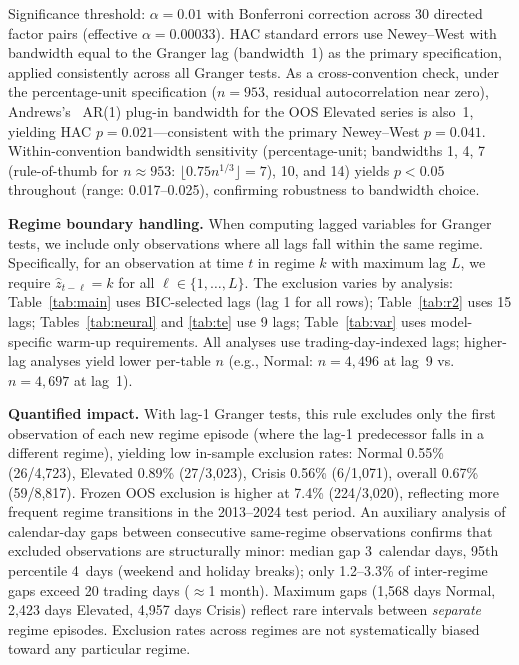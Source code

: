 \documentclass[sigconf,anonymous]{acmart}
\begin{document}
Significance threshold: $\alpha = 0.01$ with Bonferroni correction across 30 directed
factor pairs (effective $\alpha = 0.00033$). HAC standard errors use Newey--West
with bandwidth equal to the Granger lag (bandwidth~1) as the primary specification,
applied consistently across all Granger tests. As a cross-convention check,
under the percentage-unit specification ($n = 953$, residual autocorrelation near zero),
Andrews's~\cite{andrews1991heteroskedasticity} AR(1) plug-in bandwidth for the
OOS Elevated series is also~1, yielding HAC $p = 0.021$---consistent with
the primary Newey--West $p = 0.041$.
Within-convention bandwidth sensitivity (percentage-unit; bandwidths 1, 4, 7
(rule-of-thumb for $n \approx 953$: $\lfloor 0.75 n^{1/3} \rfloor = 7$), 10, and 14)
yields $p < 0.05$ throughout (range: 0.017--0.025), confirming robustness to bandwidth choice.

\textbf{Regime boundary handling.} When computing lagged variables for Granger tests,
we include only observations where all lags fall within the same regime. Specifically,
for an observation at time $t$ in regime $k$ with maximum lag $L$, we require
$\hat{z}_{t-\ell} = k$ for all $\ell \in \{1, \ldots, L\}$. The exclusion varies
by analysis: Table~\ref{tab:main} uses BIC-selected lags (lag 1 for all rows);
Table~\ref{tab:r2} uses 15 lags; Tables~\ref{tab:neural} and \ref{tab:te} use
9 lags; Table~\ref{tab:var} uses model-specific warm-up requirements.
All analyses use trading-day-indexed lags; higher-lag analyses yield lower per-table $n$
(e.g., Normal: $n = 4{,}496$ at lag~9 vs.\ $n = 4{,}697$ at lag~1).

\textbf{Quantified impact.} With lag-1 Granger tests, this rule excludes only the
first observation of each new regime episode (where the lag-1 predecessor falls in a
different regime), yielding low in-sample exclusion rates:
Normal 0.55\% (26/4,723), Elevated 0.89\% (27/3,023), Crisis 0.56\% (6/1,071),
overall 0.67\% (59/8,817).
Frozen OOS exclusion is higher at 7.4\% (224/3,020), reflecting more frequent
regime transitions in the 2013--2024 test period.
An auxiliary analysis of calendar-day gaps between consecutive same-regime
observations confirms that excluded observations are structurally minor:
median gap 3~calendar days, 95th percentile 4~days (weekend and holiday breaks);
only 1.2--3.3\% of inter-regime gaps exceed 20 trading days ($\approx$1 month).
Maximum gaps (1,568 days Normal, 2,423 days Elevated, 4,957 days Crisis) reflect
rare intervals between \emph{separate} regime episodes.
Exclusion rates across regimes are not systematically biased toward any particular regime.
\end{document}
